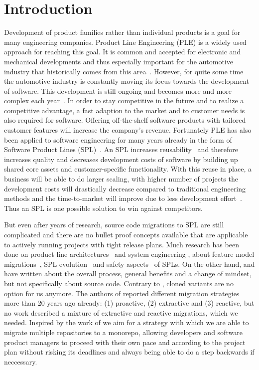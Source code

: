 \section{Introduction}

Development of product families rather than individual products is a goal for
many engineering companies. Product Line Engineering (PLE) is a widely used
approach for reaching this goal. It is common and accepted for electronic and
mechanical developments and thus especially important for the automotive
industry that historically comes from this area~\cite{bookssp19X19}. However,
for quite some time the automotive industry is constantly moving its focus
towards the development of software. This development is still ongoing and
becomes more and more complex each year~\cite{ICSE03498}. In order to stay
competitive in the future and to realize a competitive advantage, a fast
adaption to the market and to customer needs is also required for software.
Offering off-the-shelf software products with tailored customer features will
increase the company's revenue. Fortunately PLE has also been applied to
software engineering for many years already in the form of Software Product
Lines (SPL)~\cite{confsplc2000}. An SPL increases reusability~\cite{Clem02a} and
therefore increases quality and decreases development costs of software by
building up shared core assets and customer-specific functionality. With this
reuse in place, a business will be able to do larger scaling, with higher number
of projects the development costs will drastically decrease compared to
traditional engineering methods and the time-to-market will improve due to less
development effort~\cite{confsplcAzanzaMD21}. Thus an SPL is one possible
solution to win against competitors.

But even after years of research, source code migrations to SPL are still
complicated and there are no bullet proof concepts available that are applicable
to actively running projects with tight release plans. Much research has been
done on product line architectures~\cite{Svahnberg1999EPLA,
confsplcTomashchukLJ21} and system engineering \cite{confsplcSchaferBAKR21},
about feature model migrations~\cite{ncstrlustuttgartfiINPROC200185,
confsplcGrunerBKR20, confsplcDuszynskiDB19, confsplcFritschAR20}, SPL
evolution~\cite{journalssmrQuintonVRBGS21, Svahnberg1999ESPL, Eise02b,
kconfigKernel} and safety aspects~\cite{confsplcWolschke0SAM19} of SPLs. On the
other hand, \cite{confoopslaHetrickKM06} and \cite{confsplcAbbasJLESS20} have
written about the overall process, general benefits and a change of mindset,
but not specifically about source code. Contrary to \cite{confsplcRubinCC13},
cloned variants are no option for us anymore. The authors of
\cite{Krueger2001SMC} reported different migration strategies more than 20 years
ago already: (1) proactive, (2) extractive and (3) reactive, but no work
described a mixture of extractive and reactive migrations, which we needed.
Inspired by the work of \cite{confsplcJepsenDB07} we aim for a strategy with
which we are able to migrate multiple repositories to a monorepo, allowing
developers and software product managers to proceed with their own pace and
according to the project plan without risking its deadlines and always being
able to do a step backwards if neccessary.

